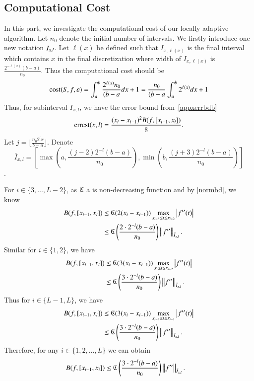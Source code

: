 \subsection{Computational Cost}

In this part, we investigate the computational cost of our locally adaptive algorithm. Let $n_0$ denote the initial number of intervals. We firstly introduce one new notation $\Ixl$. Let
$\ell(x)$ be defined such that
$I_{x,\ell(x)}$ is the final interval which contains $x$ in the final discretization where width of $I_{x,\ell(x)}$ is
$\frac{2^{-\ell(x)}(b-a)}{n_0}$.
Thus the computational cost should be
\[
\cost(S,f,\varepsilon) =\int_a^b \frac{2^{\ell(x)}n_0}{(b-a} dx +1 = \frac{n_0}{(b-a} \int_a^b 2^{\ell(x)} dx +1
\]
Thus, for subinterval $I_{x,l}$, we have the error bound from~\eqref{appxerrbdb}
$$\errest(x,l)=\frac{(x_i - x_{i-1})^2B(f,[x_{i-1},x_i])}{8}.$$
Let $j=\lfloor\frac{n_0 2^l x}{b-a}\rfloor$. Denote
\[\bar{I}_{x,l}=\left[\max\left(a, \frac{(j-2)2^{-l}(b-a)}{n_0}\right), \min\left(b, \frac{(j+3)2^{-l}(b-a)}{n_0}\right)\right]
\].

For $i \in \{3, \ldots, L-2\}$,  as $\fC$ a is non-decreasing function and by \eqref{normbd}, we know
\begin{align*}
B(f,[x_{i-1},x_i]) & \le \fC (2(x_i-x_{i-1}))\max\limits_{x_{i-3}\le t \le x_{i+2}}\abs{f''(t)}\\
& \le \fC\left(\frac{2 \cdot2^{-l}(b-a)}{n_0}\right) \norm[\bar{I}_{x,l}]{f''}.
\end{align*}
Similar for $i\in \{1,2\}$, we have
\begin{align*}
B(f,[x_{i-1},x_i]) & \le \fC(3(x_i-x_{i-1}))\max\limits_{x_{i}\le t \le x_{i+2}}\abs{f''(t)}\\
& \le \fC\left(\frac{3\cdot2^{-l}(b-a)}{n_0}\right) \norm[\bar{I}_{x,l}]{f''}.
\end{align*}
Thus for $i \in \{L-1,L\}$, we have
\begin{align*}
B(f,[x_{i-1},x_i]) & \le \fC(3(x_i-x_{i-1})) \max\limits_{x_{i-3}\le t \le x_{i-1}}\abs{f''(t)}\\
& \le \fC\left(\frac{3\cdot2^{-l}(b-a)}{n_0}\right) \norm[\bar{I}_{x,l}]{f''}.
\end{align*}
Therefore, for any $i \in \{1,2,\ldots, L\}$ we can obtain
\begin{align*}
B(f,[x_{i-1},x_i]) & \le \fC\left(\frac{3\cdot2^{-l}(b-a)}{n_0}\right)  \norm[\bar{I}_{x,l}]{f''}.
\end{align*}

